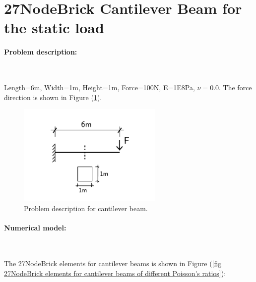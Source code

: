 \documentclass[fleqn,11pt]{article}
\begin{document}
\section{27NodeBrick Cantilever Beam for the static load}

\paragraph{Problem description: } ~

Length=6m, Width=1m, Height=1m, Force=100N, E=1E8Pa, $\nu=0.0$.
The force direction is shown in Figure (\ref{fig Problem description for cantilever beams of different Poisson's 27}). 

\begin{figure}[!htb]
  \centering
  \includegraphics[width=7cm]{../Figure-files/_Chapter_Appendix_Illustrative_Examples/cantilever_6.pdf}
  \caption{Problem description for cantilever beam.}
  \label{fig Problem description for cantilever beams of different Poisson's 27}
\end{figure}

\paragraph{Numerical model:} ~

The  27NodeBrick  elements  for  cantilever  beams  is shown in Figure (\ref{fig 27NodeBrick elements for cantilever beams of different Poisson's ratios}):
\end{document}
